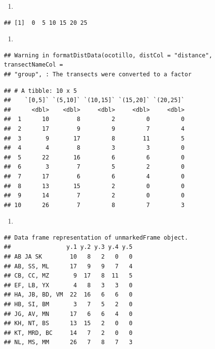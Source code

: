 \documentclass[
]{article}
\providecommand{\tightlist}{%
  \setlength{\itemsep}{0pt}\setlength{\parskip}{0pt}}
\begin{document}
\begin{enumerate}
\def\labelenumi{\arabic{enumi}.}
\setcounter{enumi}{17}
\tightlist
\item
\end{enumerate}

\begin{verbatim}
## [1]  0  5 10 15 20 25
\end{verbatim}

\begin{enumerate}
\def\labelenumi{\arabic{enumi}.}
\setcounter{enumi}{18}
\tightlist
\item
\end{enumerate}

\begin{verbatim}
## Warning in formatDistData(ocotillo, distCol = "distance", transectNameCol =
## "group", : The transects were converted to a factor
\end{verbatim}

\begin{verbatim}
## # A tibble: 10 x 5
##    `[0,5]` `(5,10]` `(10,15]` `(15,20]` `(20,25]`
##      <dbl>    <dbl>     <dbl>     <dbl>     <dbl>
##  1      10        8         2         0         0
##  2      17        9         9         7         4
##  3       9       17         8        11         5
##  4       4        8         3         3         0
##  5      22       16         6         6         0
##  6       3        7         5         2         0
##  7      17        6         6         4         0
##  8      13       15         2         0         0
##  9      14        7         2         0         0
## 10      26        7         8         7         3
\end{verbatim}

\begin{enumerate}
\def\labelenumi{\arabic{enumi}.}
\setcounter{enumi}{19}
\tightlist
\item
\end{enumerate}

\begin{verbatim}
## Data frame representation of unmarkedFrame object.
##                y.1 y.2 y.3 y.4 y.5
## AB JA SK        10   8   2   0   0
## AB, SS, ML      17   9   9   7   4
## CB, CC, MZ       9  17   8  11   5
## EF, LB, YX       4   8   3   3   0
## HA, JB, BD, VM  22  16   6   6   0
## HB, SI, BM       3   7   5   2   0
## JG, AV, MN      17   6   6   4   0
## KH, NT, BS      13  15   2   0   0
## KT, MRD, BC     14   7   2   0   0
## NL, MS, MM      26   7   8   7   3
\end{verbatim}
\end{document}
